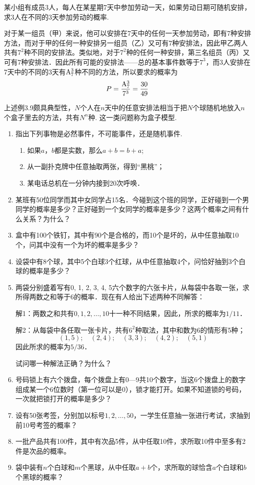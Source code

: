 \begin{example}
    某小组有成员3人，每人在某星期7天中参加劳动一天，如果劳动日期可随机安排，求3人在不同的3天参加劳动的概率.
\end{example}

\begin{solution}
    对于某一组员（甲）来说，他可以安排在7天中的任何一天参加劳动，即有7种安排方法，而对于甲的任何一种安排另一组员（乙）又可有7种安排法，因此甲乙两人共有$7^2$种不同的安排法。类似地，对于$7^2$种的任何一种安排，第三名组员（丙）又可有7种安排法．因此所有可能的安排法——总的基本事件数等于$7^3$，而3人安排在7天中的不同的3天有${\rm A}^3_7$种不同的方法，所以要求的概率为
\[P=\frac{{\rm A}^3_7}{7^3}=\frac{30}{49}\]
\end{solution}

上述例3.9颇具典型性，$N$个人在$n$天中的任意安排法相当于把$N$个球随机地放入$n$个盒子里去的方法，共有$N^n$种. 这一类问题称为盒子模型.

\begin{ex}
\begin{enumerate}
    \item 指出下列事物是必然事件，不可能事件，还是随机事件.
\begin{enumerate}[(1)]
\item 如果$a$，$b$都是实数，那么$a+b=b+a$;
\item 从一副扑克牌中任意抽取两张，得到“黑桃”；
\item 某电话总机在一分钟内接到20次呼唤．
\end{enumerate}
\item 某班有50位同学而其中女同学占15名．今碰到这个班的同学，正好碰到一个男同学的概率是多少？正好碰到一个女同学的概率是多少？这两个概率之间有什么关系？为什么？
\item 盒中有100个铁钉，其中有90个是合格的，而10个是坏的，从中任意抽取10个，问其中没有一个为坏的概率是多少？
\item 设袋中有8个球，其中5个白球3个红球，从中任意抽取4个，问恰好抽到3个白球的概率是多少？
\item 两袋分别盛着写有0, 1, 2, 3, 4, 5六个数字的六张卡片，从每袋中各取一张，求所得两数之和等于6的概率．现在有人给出下述两种不同解答：

解1：两数之和共有$0,1,2,\ldots,10$十一种不同结果，因此，所求的概率为$1/11$．

解2：从每袋中各任取一张卡片，共有$6^2$种取法，其中和数为6的情形有5种；
\[(1,5);\quad (2,4);\quad (3,3);\quad (4,2);\quad (5,1)\]
因此所求的概率为$5/36$．

试问哪一种解法正确？为什么？
\item 号码锁上有六个拨盘，每个拨盘上有0—9共10个数字，当这6个拨盘上的数字组成某一个6位数时（第一位可以是0），锁才能打开。如果不知道锁的号码，一次就把锁打开的概率是多少？
\item 设有50张考签，分别加以标号$1,2,\ldots,50$，一学生任意抽一张进行考试，求抽到前10号考签的概率？
\item 一批产品共有100件，其中有次品5件，从中任取10件，求所取10件中至多有2件是次品的概率。
\item 袋中装有$n$个白球和$m$个黑球，从中任取$a+b$个，求所取的球恰含$a$个白球和$b$个黑球的概率？
\end{enumerate}
\end{ex}

